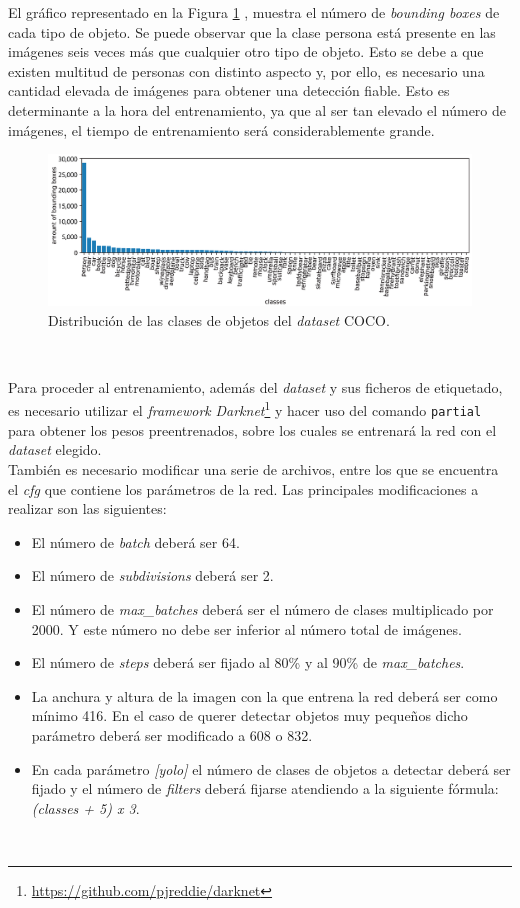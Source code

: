 El gráfico representado en la Figura \ref{fig:graphcoco} \cite{graphcoco}, muestra el número de \textit{bounding boxes} de cada tipo de objeto. Se puede observar que la clase persona está presente en las imágenes seis veces más que cualquier otro tipo de objeto. Esto se debe a que existen multitud de personas con distinto aspecto y, por ello, es necesario una cantidad elevada de imágenes para obtener una detección fiable. Esto es determinante a la hora del entrenamiento, ya que al ser tan elevado el número de imágenes, el tiempo de entrenamiento será considerablemente grande.\\

\begin{figure} [h!]
	\begin{center}
		\includegraphics[width=16cm]{figs/graphcoco}
	\end{center}
	\caption{Distribución de las clases de objetos del \textit{dataset} COCO.}
	\label{fig:graphcoco}
\end{figure}\

Para proceder al entrenamiento, además del \textit{dataset} y sus ficheros de etiquetado, es necesario utilizar el \textit{framework} \textit{Darknet}\footnote{\url{https://github.com/pjreddie/darknet}} y hacer uso del comando \verb|partial| para obtener los pesos preentrenados, sobre los cuales se entrenará la red con el \textit{dataset} elegido.\\

También es necesario modificar una serie de archivos, entre los que se encuentra el \textit{cfg} que contiene los parámetros de la red. Las principales modificaciones a realizar son las siguientes:
\begin{itemize}
	\item El número de \textit{batch} deberá ser 64.
	\item El número de \textit{subdivisions} deberá ser 2.
	\item El número de \textit{max\_batches} deberá ser el número de clases multiplicado por 2000. Y este número no debe ser inferior al número total de imágenes.
	\item El número de \textit{steps} deberá ser fijado al 80\% y al 90\% de \textit{max\_batches}.
	\item La anchura y altura de la imagen con la que entrena la red deberá ser como mínimo 416. En el caso de querer detectar objetos muy pequeños dicho parámetro deberá ser modificado a 608 o 832.
	\item En cada parámetro \textit{[yolo]} el número de clases de objetos a detectar deberá ser fijado y el número de \textit{filters} deberá fijarse atendiendo a la siguiente fórmula: \textit{(classes + 5) x 3}.
\end{itemize}\

